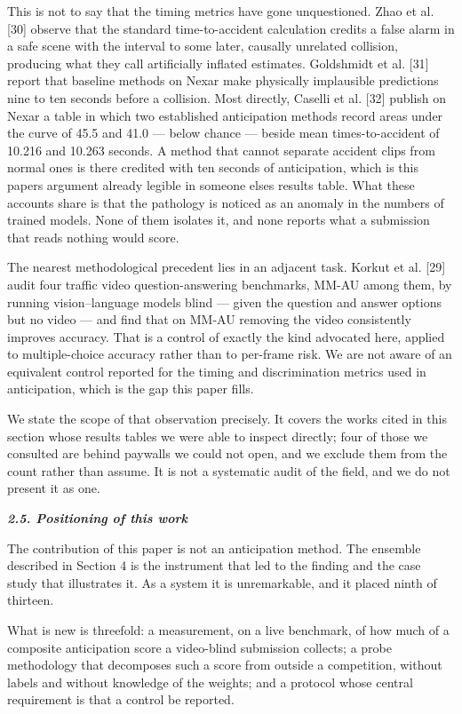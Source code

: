 This is not to say that the timing metrics have gone unquestioned. Zhao et al. {[}30{]} observe that the standard time-to-accident calculation credits a false alarm in a safe scene with the interval to some later, causally unrelated collision, producing what they call artificially inflated estimates. Goldshmidt et al. {[}31{]} report that baseline methods on Nexar make physically implausible predictions nine to ten seconds before a collision. Most directly, Caselli et al. {[}32{]} publish on Nexar a table in which two established anticipation methods record areas under the curve of 45.5 and 41.0 --- below chance --- beside mean times-to-accident of 10.216 and 10.263 seconds. A method that cannot separate accident clips from normal ones is there credited with ten seconds of anticipation, which is this paper\textquotesingle s argument already legible in someone else\textquotesingle s results table. What these accounts share is that the pathology is noticed as an anomaly in the numbers of trained models. None of them isolates it, and none reports what a submission that reads nothing would score.

The nearest methodological precedent lies in an adjacent task. Korkut et al. {[}29{]} audit four traffic video question-answering benchmarks, MM-AU among them, by running vision--language models blind --- given the question and answer options but no video --- and find that on MM-AU removing the video consistently improves accuracy. That is a control of exactly the kind advocated here, applied to multiple-choice accuracy rather than to per-frame risk. We are not aware of an equivalent control reported for the timing and discrimination metrics used in anticipation, which is the gap this paper fills.

We state the scope of that observation precisely. It covers the works cited in this section whose results tables we were able to inspect directly; four of those we consulted are behind paywalls we could not open, and we exclude them from the count rather than assume. It is not a systematic audit of the field, and we do not present it as one.

\emph{\textbf{2.5. Positioning of this work}}

The contribution of this paper is not an anticipation method. The ensemble described in Section 4 is the instrument that led to the finding and the case study that illustrates it. As a system it is unremarkable, and it placed ninth of thirteen.

What is new is threefold: a measurement, on a live benchmark, of how much of a composite anticipation score a video-blind submission collects; a probe methodology that decomposes such a score from outside a competition, without labels and without knowledge of the weights; and a protocol whose central requirement is that a control be reported.


